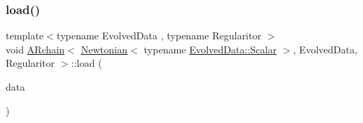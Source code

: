 \mbox{\label{class_a_rchain_3_01_newtonian_3_01typename_01_evolved_data_1_1_scalar_01_4_00_01_evolved_data_00_01_regularitor_01_4_a8e7bc5b32dbd7a0c9c3541f17fa54e28}} 
\subsubsection{\texorpdfstring{load()}{load()}}
{\footnotesize\ttfamily template$<$typename Evolved\+Data , typename Regularitor $>$ \\
void \mbox{\hyperlink{class_a_rchain}{A\+Rchain}}$<$ \mbox{\hyperlink{class_newtonian}{Newtonian}}$<$ typename \mbox{\hyperlink{class_a_rchain_a707e42a79e4744424a34c9007e84ee07}{Evolved\+Data\+::\+Scalar}} $>$, Evolved\+Data, Regularitor $>$\+::load (\begin{DoxyParamCaption}\item[{\mbox{\hyperlink{class_a_rchain_3_01_newtonian_3_01typename_01_evolved_data_1_1_scalar_01_4_00_01_evolved_data_00_01_regularitor_01_4_a8cf940df8dabb6c78662f839c2b13c9a}{Plain\+Array}} \&}]{data }\end{DoxyParamCaption})}

